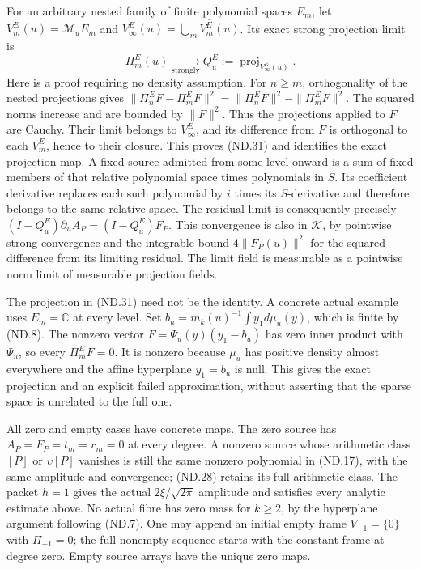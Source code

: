 For an arbitrary nested family of finite polynomial spaces
\(E_m\), let \(V_m^E(u)=\mathcal M_uE_m\) and
\(V_\infty^E(u)=\overline{\bigcup_m V_m^E(u)}\). Its exact
strong projection limit is
\[
 \Pi_m^E(u)\xrightarrow[\text{strongly}]{}
           Q_u^E:=\operatorname{proj}_{V_\infty^E(u)}.
 \tag{ND.31}
\]
Here is a proof requiring no density assumption. For \(n\ge m\),
orthogonality of the nested projections gives
\(\|\Pi_n^EF-\Pi_m^EF\|^2=\|\Pi_n^EF\|^2-\|\Pi_m^EF\|^2\).
The squared norms increase and are bounded by \(\|F\|^2\).
Thus the projections applied to \(F\) are Cauchy. Their limit
belongs to \(V_\infty^E\), and its difference from \(F\) is
orthogonal to each \(V_m^E\), hence to their closure. This proves
(ND.31) and identifies the exact projection map. A fixed source
admitted from some level onward is a sum of fixed members of that
relative polynomial space times polynomials in \(S\). Its coefficient
derivative replaces each such polynomial by \(i\) times its
\(S\)-derivative and therefore belongs to the same relative space.
The residual limit is consequently precisely
\((I-Q_u^E)\partial_uA_P=(I-Q_u^E)F_P\). This convergence is
also in \(\mathscr K\), by pointwise strong convergence and the
integrable bound \(4\|F_P(u)\|^2\) for the squared difference
from its limiting residual. The limit field is measurable as a
pointwise norm limit of measurable projection fields.

The projection in (ND.31) need not be the identity. A concrete actual
example uses \(E_m=\mathbb C\) at every level. Set
\(b_u=m_k(u)^{-1}\int y_1d\mu_u(y)\), which is finite by (ND.8).
The nonzero vector \(F=\Psi_u(y)(y_1-b_u)\) has zero inner product
with \(\Psi_u\), so every \(\Pi_m^EF=0\). It is nonzero because
\(\mu_u\) has positive density almost everywhere and the affine
hyperplane \(y_1=b_u\) is null. This gives the exact projection
and an explicit failed approximation, without asserting that the
sparse space is unrelated to the full one.

All zero and empty cases have concrete maps. The zero source has
\(A_P=F_P=t_m=r_m=0\) at every degree. A nonzero source whose
arithmetic class \([P]\) or \(\upsilon[P]\) vanishes is still the
same nonzero polynomial in (ND.17), with the same amplitude and
convergence; (ND.28) retains its full arithmetic class. The packet
\(h=1\) gives the actual \(2\xi/\sqrt{2\pi}\) amplitude and
satisfies every analytic estimate above. No actual fibre has zero
mass for \(k\ge2\), by the hyperplane argument following (ND.7).
One may append an initial empty frame \(V_{-1}=\{0\}\) with
\(\Pi_{-1}=0\); the full nonempty sequence starts with the constant
frame at degree zero. Empty source arrays have the unique zero maps.

